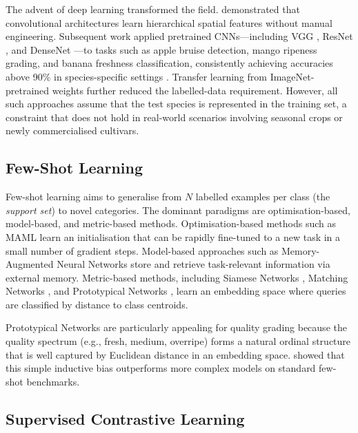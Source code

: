\documentclass[preprint,12pt,authoryear]{elsarticle}
\begin{document}
The advent of deep learning transformed the field. \citet{lecun1998gradient}
demonstrated that convolutional architectures learn hierarchical spatial features
without manual engineering. Subsequent work applied pretrained CNNs---including
VGG \citep{simonyan2014very}, ResNet \citep{he2016deep}, and DenseNet
\citep{huang2017densely}---to tasks such as apple bruise detection, mango ripeness
grading, and banana freshness classification, consistently achieving accuracies
above 90\% in species-specific settings \citep{lu2020recent}. Transfer learning
from ImageNet-pretrained weights further reduced the labelled-data requirement.
However, all such approaches assume that the test species is represented in the
training set, a constraint that does not hold in real-world scenarios involving
seasonal crops or newly commercialised cultivars.

\subsection{Few-Shot Learning}

Few-shot learning aims to generalise from $N$ labelled examples per class (the
\emph{support set}) to novel categories. The dominant paradigms are
optimisation-based, model-based, and metric-based methods.
Optimisation-based methods such as MAML \citep{finn2017model} learn an
initialisation that can be rapidly fine-tuned to a new task in a small number of
gradient steps. Model-based approaches such as Memory-Augmented Neural Networks
\citep{santoro2016meta} store and retrieve task-relevant information via external
memory. Metric-based methods, including Siamese Networks \citep{koch2015siamese},
Matching Networks \citep{vinyals2016matching}, and Prototypical Networks
\citep{snell2017prototypical}, learn an embedding space where queries are
classified by distance to class centroids.

Prototypical Networks are particularly appealing for quality grading because the
quality spectrum (e.g., fresh, medium, overripe) forms a natural ordinal structure
that is well captured by Euclidean distance in an embedding space.
\citet{snell2017prototypical} showed that this simple inductive bias outperforms
more complex models on standard few-shot benchmarks.

\subsection{Supervised Contrastive Learning}
\end{document}
